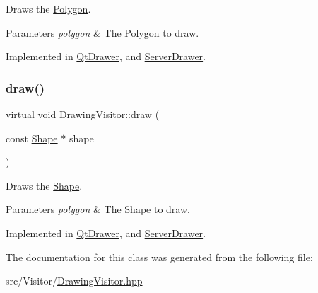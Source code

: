 Draws the \hyperlink{class_polygon}{Polygon}. 
\begin{DoxyParams}{Parameters}
{\em polygon} & The \hyperlink{class_polygon}{Polygon} to draw. \\
\hline
\end{DoxyParams}


Implemented in \hyperlink{class_qt_drawer_a977cc5f97827eb36063f8429ef044727}{Qt\+Drawer}, and \hyperlink{class_server_drawer_acd973f89e7618d67fcd8db364df0b6bf}{Server\+Drawer}.

\hypertarget{class_drawing_visitor_ad3d9e3028449f65ea2c405c74c4a55b4}{}\label{class_drawing_visitor_ad3d9e3028449f65ea2c405c74c4a55b4} 
\subsubsection{\texorpdfstring{draw()}{draw()}\hspace{0.1cm}{\footnotesize\ttfamily [5/5]}}
{\footnotesize\ttfamily virtual void Drawing\+Visitor\+::draw (\begin{DoxyParamCaption}\item[{const \hyperlink{class_shape}{Shape} $\ast$}]{shape }\end{DoxyParamCaption})\hspace{0.3cm}{\ttfamily [pure virtual]}}

Draws the \hyperlink{class_shape}{Shape}. 
\begin{DoxyParams}{Parameters}
{\em polygon} & The \hyperlink{class_shape}{Shape} to draw. \\
\hline
\end{DoxyParams}


Implemented in \hyperlink{class_qt_drawer_a031e3b3242e341fa6e6fdcbf96b3dbfe}{Qt\+Drawer}, and \hyperlink{class_server_drawer_a071fa49ab9edc71554b32aaaf7422b7f}{Server\+Drawer}.



The documentation for this class was generated from the following file\+:\begin{DoxyCompactItemize}
\item 
src/\+Visitor/\hyperlink{_drawing_visitor_8hpp}{Drawing\+Visitor.\+hpp}\end{DoxyCompactItemize}
